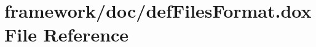 \hypertarget{def_files_format_8dox}{}\section{framework/doc/def\+Files\+Format.dox File Reference}
\label{def_files_format_8dox}
